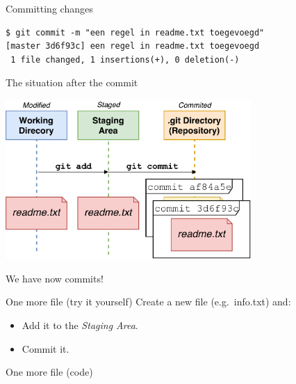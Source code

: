 \documentclass[
  11pt,
  american,
  ignorenonframetext,
  aspectratio=43,
  compress,
  xcolor=dvipsnames]{beamer}
\newenvironment{Shaded}{}{}
\newcommand{\AttributeTok}[1]{\textcolor[rgb]{0.49,0.56,0.16}{#1}}
\newcommand{\ExtensionTok}[1]{#1}
\newcommand{\NormalTok}[1]{#1}
\newcommand{\StringTok}[1]{\textcolor[rgb]{0.25,0.44,0.63}{#1}}
\providecommand{\tightlist}{%
  \setlength{\itemsep}{0pt}\setlength{\parskip}{0pt}}
\begin{document}
\begin{frame}[fragile]{Committing changes}
\protect\hypertarget{committing-changes}{}
\begin{verbatim}
$ git commit -m "een regel in readme.txt toegevoegd"
[master 3d6f93c] een regel in readme.txt toegevoegd
 1 file changed, 1 insertions(+), 0 deletion(-)
\end{verbatim}
\end{frame}

\begin{frame}{The situation after the commit}
\protect\hypertarget{the-situation-after-the-commit}{}
\begin{center}
\includegraphics[width=0.7\textwidth]{./images/git_workflow_two_commits.pdf}
\end{center}

We have now commits!
\end{frame}

\begin{frame}{One more file (try it yourself)}
\protect\hypertarget{one-more-file-try-it-yourself}{}
Create a new file (e.g.~info.txt) and:

\begin{itemize}
\tightlist
\item
  Add it to the \emph{Staging Area}.
\item
  Commit it.
\end{itemize}
\end{frame}

\begin{frame}[fragile]{One more file (code)}
\protect\hypertarget{one-more-file-code}{}
\begin{Shaded}
\end{Shaded}
\end{frame}
\end{document}
